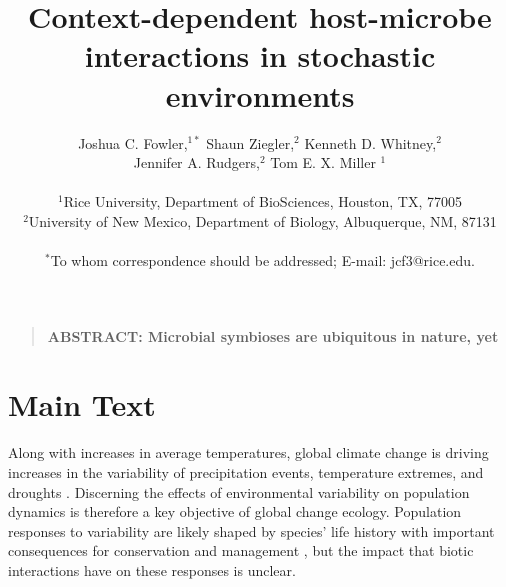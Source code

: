 \documentclass[12pt]{article}
\title{Context-dependent host-microbe interactions in stochastic environments}
\author
{Joshua C. Fowler,$^{1\ast}$ Shaun Ziegler,$^{2}$ Kenneth D. Whitney,$^{2}$\\
	 Jennifer A. Rudgers,$^{2}$ Tom E. X. Miller $^{1}$\\
\\
\normalsize{$^{1}$Rice University, Department of BioSciences, Houston, TX, 77005}\\
\normalsize{$^{2}$University of New Mexico, Department of Biology, Albuquerque, NM, 87131}\\
\\
\normalsize{$^\ast$To whom correspondence should be addressed; E-mail:  jcf3@rice.edu.}
}
\date{}
\newenvironment{sciabstract}{%
\begin{quote} \bf}
{\end{quote}}
\begin{document}
 


\baselineskip24pt


\maketitle 




\begin{sciabstract}
	ABSTRACT: Microbial symbioses are ubiquitous in nature, yet 


\end{sciabstract}




\section*{Main Text}

Along with increases in average temperatures, global climate change is driving increases in the variability of precipitation events, temperature extremes, and droughts \cite{IPCC2012managing,seneviratne2012changes,stocker2013technical}.
Discerning the effects of environmental variability on population dynamics is therefore a key objective of global change ecology. 
Population responses to variability are likely shaped by species' life history \cite{pfister1998patterns,morris2008longevity,saether2013life} with important consequences for conservation and management \cite{menges2000applications}, but the impact that biotic interactions have on these responses is unclear.
\end{document}
